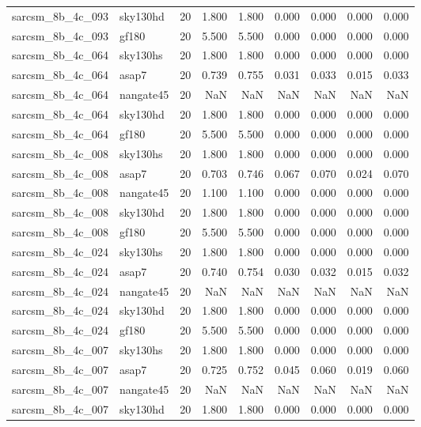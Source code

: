 \begin{tabular}{llrrrrrrr}
sarcsm\_8b\_4c\_093 & sky130hd & 20 & 1.800 & 1.800 & 0.000 & 0.000 & 0.000 & 0.000 \\
sarcsm\_8b\_4c\_093 & gf180 & 20 & 5.500 & 5.500 & 0.000 & 0.000 & 0.000 & 0.000 \\
sarcsm\_8b\_4c\_064 & sky130hs & 20 & 1.800 & 1.800 & 0.000 & 0.000 & 0.000 & 0.000 \\
sarcsm\_8b\_4c\_064 & asap7 & 20 & 0.739 & 0.755 & 0.031 & 0.033 & 0.015 & 0.033 \\
sarcsm\_8b\_4c\_064 & nangate45 & 20 & NaN & NaN & NaN & NaN & NaN & NaN \\
sarcsm\_8b\_4c\_064 & sky130hd & 20 & 1.800 & 1.800 & 0.000 & 0.000 & 0.000 & 0.000 \\
sarcsm\_8b\_4c\_064 & gf180 & 20 & 5.500 & 5.500 & 0.000 & 0.000 & 0.000 & 0.000 \\
sarcsm\_8b\_4c\_008 & sky130hs & 20 & 1.800 & 1.800 & 0.000 & 0.000 & 0.000 & 0.000 \\
sarcsm\_8b\_4c\_008 & asap7 & 20 & 0.703 & 0.746 & 0.067 & 0.070 & 0.024 & 0.070 \\
sarcsm\_8b\_4c\_008 & nangate45 & 20 & 1.100 & 1.100 & 0.000 & 0.000 & 0.000 & 0.000 \\
sarcsm\_8b\_4c\_008 & sky130hd & 20 & 1.800 & 1.800 & 0.000 & 0.000 & 0.000 & 0.000 \\
sarcsm\_8b\_4c\_008 & gf180 & 20 & 5.500 & 5.500 & 0.000 & 0.000 & 0.000 & 0.000 \\
sarcsm\_8b\_4c\_024 & sky130hs & 20 & 1.800 & 1.800 & 0.000 & 0.000 & 0.000 & 0.000 \\
sarcsm\_8b\_4c\_024 & asap7 & 20 & 0.740 & 0.754 & 0.030 & 0.032 & 0.015 & 0.032 \\
sarcsm\_8b\_4c\_024 & nangate45 & 20 & NaN & NaN & NaN & NaN & NaN & NaN \\
sarcsm\_8b\_4c\_024 & sky130hd & 20 & 1.800 & 1.800 & 0.000 & 0.000 & 0.000 & 0.000 \\
sarcsm\_8b\_4c\_024 & gf180 & 20 & 5.500 & 5.500 & 0.000 & 0.000 & 0.000 & 0.000 \\
sarcsm\_8b\_4c\_007 & sky130hs & 20 & 1.800 & 1.800 & 0.000 & 0.000 & 0.000 & 0.000 \\
sarcsm\_8b\_4c\_007 & asap7 & 20 & 0.725 & 0.752 & 0.045 & 0.060 & 0.019 & 0.060 \\
sarcsm\_8b\_4c\_007 & nangate45 & 20 & NaN & NaN & NaN & NaN & NaN & NaN \\
sarcsm\_8b\_4c\_007 & sky130hd & 20 & 1.800 & 1.800 & 0.000 & 0.000 & 0.000 & 0.000 \\

\end{tabular}
